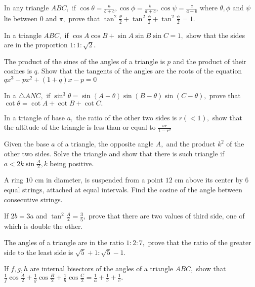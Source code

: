 \item In any triangle $ABC,$ if $\cos\theta = \frac{a}{b + c}, \cos\phi = \frac{b}{a + c}, \cos\psi = \frac{c}{a +
    b}$ where $\theta, \phi$ and $\psi$ lie between $0$ and $\pi,$ prove that
    $\tan^2\frac{\theta}{2} + \tan^2\frac{\phi}{2} + \tan^2\frac{\psi}{2} = 1.$

\item In a triangle $ABC,$ if $\cos A\cos B + \sin A\sin B\sin C = 1,$ show that the sides are in the proportion
    $1:1:\sqrt{2}.$

\item The product of the sines of the angles of a triangle is $p$ and the product of their cosines is $q.$ Show that the
    tangents of the angles are the roots of the equation $qx^3 - px^2 + (1 + q)x - p = 0$

\item In a $\triangle ANC,$ if $\sin^3\theta = \sin(A - \theta)\sin(B - \theta)\sin(C - \theta),$ prove that $\cot\theta
    = \cot A + \cot B + \cot C.$

\item In a triangle of base $a,$ the ratio of the other two sides is $r(< 1),$ show that the altitude of the triangle is
    less than or equal to $\frac{ar}{1 - r^2}$

\item Given the base $a$ of a triangle, the opposite angle $A,$ and the product $k^2$ of the other two sides. Solve
    the triangle and show that there is such triangle if $a < 2k\sin\frac{A}{2}, k$ being positive.

\item A ring $10$ cm in diameter, is suspended from a point $12$ cm above its center by $6$ equal strings, attached
    at equal intervals. Find the cosine of the angle between consecutive strings.

\item If $2b = 3a$ and $\tan^2\frac{A}{2} = \frac{3}{5},$ prove that there are two values of third side, one of which is
    double the other.

\item The angles of a triangle are in the ratio $1:2:7,$ prove that the ratio of the greater side to the least side is
    $\sqrt{5} + 1:\sqrt{5} - 1.$

\item If $f, g, h$ are internal bisectors of the angles of a triangle $ABC,$ show that
    $\frac{1}{f}\cos\frac{A}{2} + \frac{1}{g}\cos\frac{B}{2} + \frac{1}{h}\cos\frac{C}{2} = \frac{1}{a} + \frac{1}{b} +
    \frac{1}{c}.$

